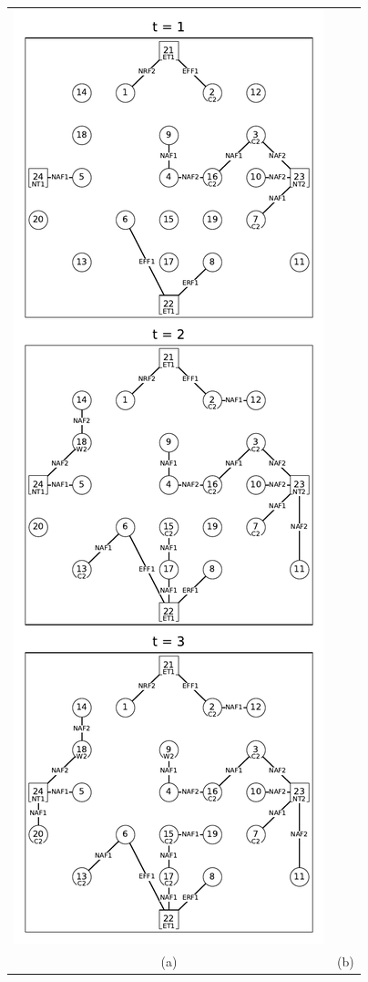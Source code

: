 \begin{figure}[H]
\begin{tabular}{cc}
    \includegraphics[width=0.49\columnwidth]{cap4/resultados/24_both6.pdf} \\
    (a) & (b) 
\end{tabular}
\label{fig:24_both1_6}
\end{figure}

